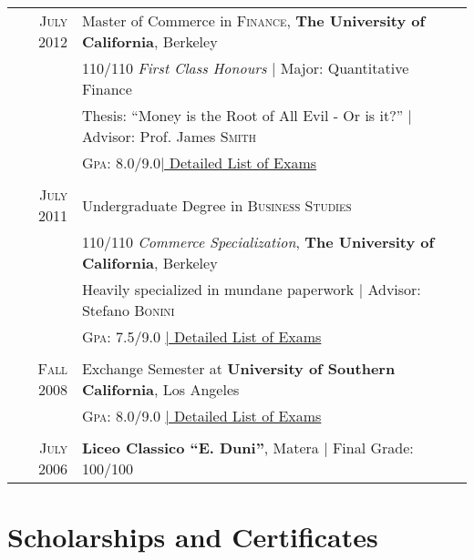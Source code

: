 \documentclass[a4paper,10pt]{article} %
\begin{document}
\begin{tabular}{rl}
\textsc{July} 2012 & Master of Commerce in \textsc{Finance}, \textbf{The University of California}, Berkeley\\
& 110/110 \small\emph{First Class Honours} | Major: Quantitative Finance\\
& Thesis: ``Money is the Root of All Evil - Or is it?'' | \small Advisor: Prof. James \textsc{Smith}\\
&\normalsize \textsc{Gpa}: 8.0/9.0\hyperlink{grds}{\hfill | \footnotesize Detailed List of Exams}\\
&\\


\textsc{July} 2011& Undergraduate Degree in \textsc{}\textsc{Business Studies} \\&110/110 \small\emph{Commerce Specialization}, \normalsize\textbf{The University of California}, Berkeley\\
& Heavily specialized in mundane paperwork | \small Advisor: Stefano \textsc{Bonini}\\
&\normalsize \textsc{Gpa}: 7.5/9.0 \hyperlink{grds_usc}{\hfill| \footnotesize Detailed List of Exams}\\
&\\


\textsc{Fall} 2008 & Exchange Semester at \textbf{University of Southern California}, Los Angeles\\
& \textsc{Gpa}: 8.0/9.0 \hyperlink{grds_usc}{\hfill| \footnotesize Detailed List of Exams}\\
&\\


\textsc{July} 2006& \textbf{Liceo Classico ``E. Duni''}, Matera | Final Grade: 100/100
\end{tabular}


\section{Scholarships and Certificates}
\end{document}
